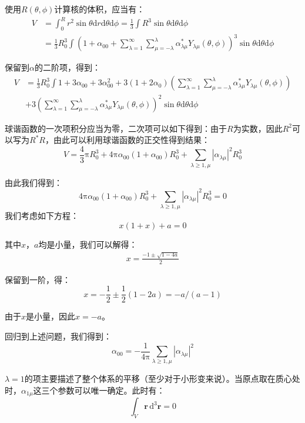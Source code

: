 \begin{booknote*}
使用$R(\theta,\phi)$计算核的体积，应当有：
\begin{align*}
V & =\int^{R}_{0}r^{2}\sin\theta\mathrm{d}r\mathrm{d}\theta\mathrm{d}\phi=\frac{1}{3}\int R^{3}\sin\theta\mathrm{d}\theta\mathrm{d}\phi\\
 & =\frac{1}{3}R^{3}_{0}\int\left(1+\alpha_{00}+\sum^{\infty}_{\lambda=1}\sum^{\lambda}_{\mu=-\lambda}\alpha^{*}_{\lambda\mu}Y_{\lambda\mu}(\theta,\phi)\right)^{3}\sin\theta\mathrm{d}\theta\mathrm{d}\phi
\end{align*}

保留到$\alpha$的二阶项，得到：
\begin{align*}
V & =\frac{1}{3}R^{3}_{0}\int1+3\alpha_{00}+3\alpha^{2}_{00}+3(1+2\alpha_{0})\left(\sum^{\infty}_{\lambda=1}\sum^{\lambda}_{\mu=-\lambda}\alpha^{*}_{\lambda\mu}Y_{\lambda\mu}(\theta,\phi)\right)\\
 & +3\left(\sum^{\infty}_{\lambda=1}\sum^{\lambda}_{\mu=-\lambda}\alpha^{*}_{\lambda\mu}Y_{\lambda\mu}(\theta,\phi)\right)^{2}\sin\theta\mathrm{d}\theta\mathrm{d}\phi
\end{align*}

球谐函数的一次项积分应当为零，二次项可以如下得到：由于$R$为实数，因此$R^{2}$可以写为$R^{*}R$，由此可以利用球谐函数的正交性得到结果：
\[
V=\frac{4}{3}\mathrm{\pi}R^{3}_{0}+4\mathrm{\pi}\alpha_{00}(1+\alpha_{00})R^{3}_{0}+\sum_{\lambda\geq1,\mu}\left|\alpha_{\lambda\mu}\right|^{2}R^{3}_{0}
\]

由此我们得到：
\[
4\mathrm{\pi}\alpha_{00}(1+\alpha_{00})R^{3}_{0}+\sum_{\lambda\geq1,\mu}\left|\alpha_{\lambda\mu}\right|^{2}R^{3}_{0}=0
\]
我们考虑如下方程：
\[
x(1+x)+a=0
\]

其中$x$，$a$均是小量，我们可以解得：
\begin{align*}
x=\frac{-1\pm\sqrt{1-4a}}{2}
\end{align*}

保留到一阶，得：
\[
x=-\frac{1}{2}\pm\frac{1}{2}(1-2a)=-a/(a-1)
\]

由于$x$是小量，因此$x=-a$。

回归到上述问题，我们得到：
\[
\alpha_{00}=-\frac{1}{4\mathrm{\pi}}\sum_{\lambda\geq1,\mu}\left|\alpha_{\lambda\mu}\right|^{2}
\]
\end{booknote*}
$\lambda=1$的项主要描述了整个体系的平移（至少对于小形变来说）。当原点取在质心处时，$\alpha_{1\mu}$这三个参数可以唯一确定。此时有：
\[
\int_{V}\boldsymbol{r}\,\mathrm{d}^{3}\boldsymbol{r}=0
\]

